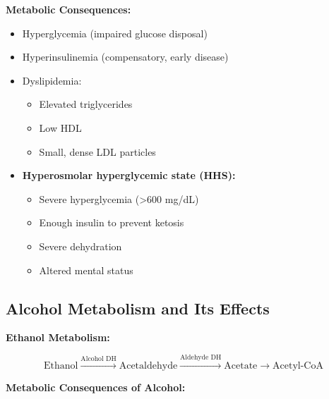\begin{tcolorbox}[colback=yellow!10, colframe=yellow!70!black, title=\textbf{Type 2 Diabetes: Insulin Resistance}]
\textbf{Metabolic Consequences:}

\begin{itemize}
    \item Hyperglycemia (impaired glucose disposal)
    \item Hyperinsulinemia (compensatory, early disease)
    \item Dyslipidemia:
    \begin{itemize}
        \item Elevated triglycerides
        \item Low HDL
        \item Small, dense LDL particles
    \end{itemize}
    \item \textbf{Hyperosmolar hyperglycemic state (HHS):}
    \begin{itemize}
        \item Severe hyperglycemia (>600 mg/dL)
        \item Enough insulin to prevent ketosis
        \item Severe dehydration
        \item Altered mental status
    \end{itemize}
\end{itemize}
\end{tcolorbox}

\subsection{Alcohol Metabolism and Its Effects}

\textbf{Ethanol Metabolism:}

\[
\text{Ethanol} \xrightarrow{\text{Alcohol DH}} \text{Acetaldehyde} \xrightarrow{\text{Aldehyde DH}} \text{Acetate} \rightarrow \text{Acetyl-CoA}
\]

\textbf{Metabolic Consequences of Alcohol:}

